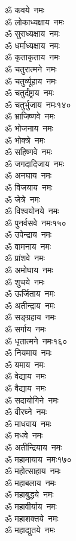 \begin{multicols}{2}
\begin{flushleft}
ॐ कवये~नमः\\
ॐ लोकाध्यक्षाय~नमः\\
ॐ सुराध्यक्षाय~नमः\\
ॐ धर्माध्यक्षाय~नमः\\
ॐ कृताकृताय~नमः\\
ॐ चतुरात्मने~नमः\\
ॐ चतुर्व्यूहाय~नमः\\
ॐ चतुर्दंष्ट्राय~नमः\\
ॐ चतुर्भुजाय~नमः\hfill १४०\\
ॐ भ्राजिष्णवे~नमः\\
ॐ भोजनाय~नमः\\
ॐ भोक्त्रे~नमः\\
ॐ सहिष्णवे~नमः\\
ॐ जगदादिजाय~नमः\\
ॐ अनघाय~नमः\\
ॐ विजयाय~नमः\\
ॐ जेत्रे~नमः\\
ॐ विश्वयोनये~नमः\\
ॐ पुनर्वसवे~नमः\hfill १५०\\
ॐ उपेन्द्राय~नमः\\
ॐ वामनाय~नमः\\
ॐ प्रांशवे~नमः\\
ॐ अमोघाय~नमः\\
ॐ शुचये~नमः\\
ॐ ऊर्जिताय~नमः\\
ॐ अतीन्द्राय~नमः\\
ॐ सङ्ग्रहाय~नमः\\
ॐ सर्गाय~नमः\\
ॐ धृतात्मने~नमः\hfill १६०\\
ॐ नियमाय~नमः\\
ॐ यमाय~नमः\\
ॐ वेद्याय~नमः\\
ॐ वैद्याय~नमः\\
ॐ सदायोगिने~नमः\\
ॐ वीरघ्ने~नमः\\
ॐ माधवाय~नमः\\
ॐ मधवे~नमः\\
ॐ अतीन्द्रियाय~नमः\\
ॐ महामायाय~नमः\hfill १७०\\
ॐ महोत्साहाय~नमः\\
ॐ महाबलाय~नमः\\
ॐ महाबुद्धये~नमः\\
ॐ महावीर्याय~नमः\\
ॐ महाशक्तये~नमः\\
ॐ महाद्युतये~नमः\\

\end{flushleft}
\end{multicols}
